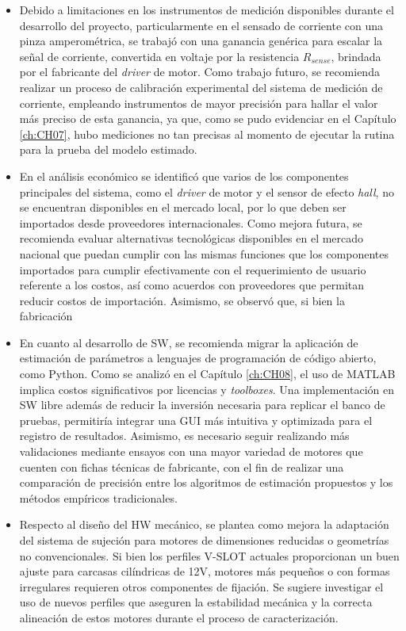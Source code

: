 \begin{itemize}

\item Debido a limitaciones en los instrumentos de medición disponibles durante el desarrollo del proyecto, particularmente en el sensado de corriente con una pinza amperométrica, se trabajó con una ganancia genérica para escalar la señal de corriente, convertida en voltaje por la resistencia $R_{sense}$, brindada por el fabricante del \textit{driver} de motor. Como trabajo futuro, se recomienda realizar un proceso de calibración experimental del sistema de medición de corriente, empleando instrumentos de mayor precisión para hallar el valor más preciso de esta ganancia, ya que, como se pudo evidenciar en el Capítulo \ref{ch:CH07}, hubo mediciones no tan precisas al momento de ejecutar la rutina para la prueba del modelo estimado. 

\item En el análisis económico se identificó que varios de los componentes principales del sistema, como el \textit{driver} de motor y el sensor de efecto \textit{hall}, no se encuentran disponibles en el mercado local, por lo que deben ser importados desde proveedores internacionales. Como mejora futura, se recomienda evaluar alternativas tecnológicas disponibles en el mercado nacional que puedan cumplir con las mismas funciones que los componentes importados para cumplir efectivamente con el requerimiento de usuario referente a los costos, así como acuerdos con proveedores que permitan reducir costos de importación. Asimismo, se observó que, si bien la fabricación 

\item En cuanto al desarrollo de \ac{SW}, se recomienda migrar la aplicación de estimación de parámetros a lenguajes de programación de código abierto, como Python. Como se analizó en el Capítulo \ref{ch:CH08}, el uso de MATLAB implica costos significativos por licencias y \textit{toolboxes}. Una implementación en \ac{SW} libre además de reducir la inversión necesaria para replicar el banco de pruebas, permitiría integrar una \ac{GUI} más intuitiva y optimizada para el registro de resultados. Asimismo, es necesario seguir realizando más validaciones mediante ensayos con una mayor variedad de motores que cuenten con fichas técnicas de fabricante, con el fin de realizar una comparación de precisión entre los algoritmos de estimación propuestos y los métodos empíricos tradicionales.

\item Respecto al diseño del \ac{HW} mecánico, se plantea como mejora la adaptación del sistema de sujeción para motores de dimensiones reducidas o geometrías no convencionales. Si bien los perfiles V-SLOT actuales proporcionan un buen ajuste para carcasas cilíndricas de 12V, motores más pequeños o con formas irregulares requieren otros componentes de fijación. Se sugiere investigar el uso de nuevos perfiles que aseguren la estabilidad mecánica y la correcta alineación de estos motores durante el proceso de caracterización.


\end{itemize}
